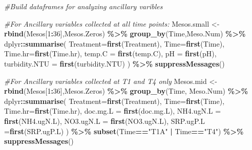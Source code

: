 \documentclass[
]{article}
\newenvironment{Shaded}{\begin{snugshade}}{\end{snugshade}}
\newcommand{\AttributeTok}[1]{\textcolor[rgb]{0.13,0.29,0.53}{#1}}
\newcommand{\CommentTok}[1]{\textcolor[rgb]{0.56,0.35,0.01}{\textit{#1}}}
\newcommand{\DecValTok}[1]{\textcolor[rgb]{0.00,0.00,0.81}{#1}}
\newcommand{\FunctionTok}[1]{\textcolor[rgb]{0.13,0.29,0.53}{\textbf{#1}}}
\newcommand{\NormalTok}[1]{#1}
\newcommand{\OtherTok}[1]{\textcolor[rgb]{0.56,0.35,0.01}{#1}}
\newcommand{\SpecialCharTok}[1]{\textcolor[rgb]{0.81,0.36,0.00}{\textbf{#1}}}
\newcommand{\StringTok}[1]{\textcolor[rgb]{0.31,0.60,0.02}{#1}}
\begin{document}
\begin{Shaded}
\begin{Highlighting}[]
\CommentTok{\#Build dataframes for analyzing ancillary varibles}

\CommentTok{\#For Ancillary variables collected at all time points:}
\NormalTok{Mesos.small }\OtherTok{\textless{}{-}} \FunctionTok{rbind}\NormalTok{(Mesos[}\DecValTok{1}\SpecialCharTok{:}\DecValTok{36}\NormalTok{],Mesos.Zeros) }\SpecialCharTok{\%\textgreater{}\%} 
  \FunctionTok{group\_by}\NormalTok{(Time,Meso.Num) }\SpecialCharTok{\%\textgreater{}\%} 
\NormalTok{  dplyr}\SpecialCharTok{::}\FunctionTok{summarise}\NormalTok{(}
    \AttributeTok{Treatment=}\FunctionTok{first}\NormalTok{(Treatment),}
    \AttributeTok{Time=}\FunctionTok{first}\NormalTok{(Time),}
    \AttributeTok{Time.hr=}\FunctionTok{first}\NormalTok{(Time.hr),}
    \AttributeTok{temp.C =} \FunctionTok{first}\NormalTok{(temp.C),}
    \AttributeTok{pH =} \FunctionTok{first}\NormalTok{(pH),}
    \AttributeTok{turbidity.NTU =} \FunctionTok{first}\NormalTok{(turbidity.NTU)}
\NormalTok{  ) }\SpecialCharTok{\%\textgreater{}\%} 
  \FunctionTok{suppressMessages}\NormalTok{()}

\CommentTok{\#For Ancillary variables collected at T1 and T4 only}
\NormalTok{Mesos.mid }\OtherTok{\textless{}{-}} \FunctionTok{rbind}\NormalTok{(Mesos[}\DecValTok{1}\SpecialCharTok{:}\DecValTok{36}\NormalTok{],Mesos.Zeros) }\SpecialCharTok{\%\textgreater{}\%} 
  \FunctionTok{group\_by}\NormalTok{(Time, Meso.Num) }\SpecialCharTok{\%\textgreater{}\%} 
\NormalTok{  dplyr}\SpecialCharTok{::}\FunctionTok{summarise}\NormalTok{(}
    \AttributeTok{Treatment=}\FunctionTok{first}\NormalTok{(Treatment),}
    \AttributeTok{Time=}\FunctionTok{first}\NormalTok{(Time),}
    \AttributeTok{Time.hr=}\FunctionTok{first}\NormalTok{(Time.hr),}
    \AttributeTok{doc.mg.L =} \FunctionTok{first}\NormalTok{(doc.mg.L),}
    \AttributeTok{NH4.ugN.L =} \FunctionTok{first}\NormalTok{(NH4.ugN.L),}
    \AttributeTok{NO3.ugN.L =} \FunctionTok{first}\NormalTok{(NO3.ugN.L),}
    \AttributeTok{SRP.ugP.L =}\FunctionTok{first}\NormalTok{(SRP.ugP.L)}
\NormalTok{  ) }\SpecialCharTok{\%\textgreater{}\%} 
  \FunctionTok{subset}\NormalTok{(Time}\SpecialCharTok{==}\StringTok{"T1A"} \SpecialCharTok{|}\NormalTok{ Time}\SpecialCharTok{==}\StringTok{"T4"}\NormalTok{) }\SpecialCharTok{\%\textgreater{}\%} 
  \FunctionTok{suppressMessages}\NormalTok{()}


\end{Highlighting}
\end{Shaded}
\end{document}
